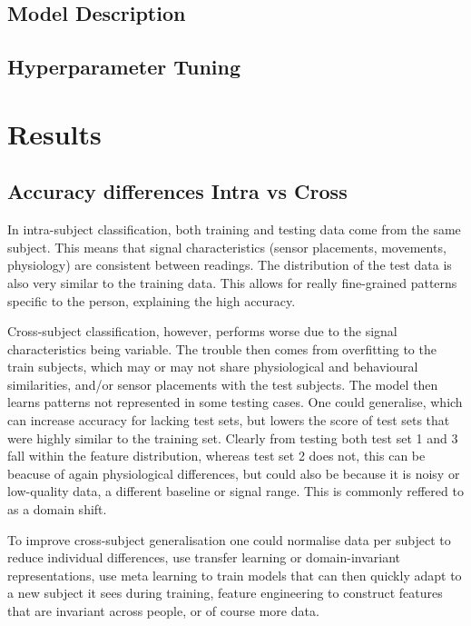 \documentclass[conference]{IEEEtran}
\begin{document}
\subsection{Model Description}


\subsection{Hyperparameter Tuning}

\section{Results}

\subsection{Accuracy differences Intra vs Cross}
In intra-subject classification, both training and testing data come from the same subject. This means that signal characteristics (sensor placements, movements, physiology) are consistent between readings. The distribution of the test data is also very similar to the training data. This allows for really fine-grained patterns specific to the person, explaining the high accuracy. 

Cross-subject classification, however, performs worse due to the signal characteristics being variable. The trouble then comes from overfitting to the train subjects, which may or may not share physiological and behavioural similarities, and/or sensor placements with the test subjects. The model then learns patterns not represented in some testing cases. One could generalise, which can increase accuracy for lacking test sets, but lowers the score of test sets that were highly similar to the training set. Clearly from testing both test set 1 and 3 fall within the feature distribution, whereas test set 2 does not, this can be beacuse of again physiological differences, but could also be because it is noisy or low-quality data, a different baseline or signal range. This is commonly reffered to as a domain shift.

To improve cross-subject generalisation one could normalise data per subject to reduce individual differences, use transfer learning or domain-invariant representations, use meta learning to train models that can then quickly adapt to a new subject it sees during training, feature engineering to construct features that are invariant across people, or of course more data.
\end{document}
